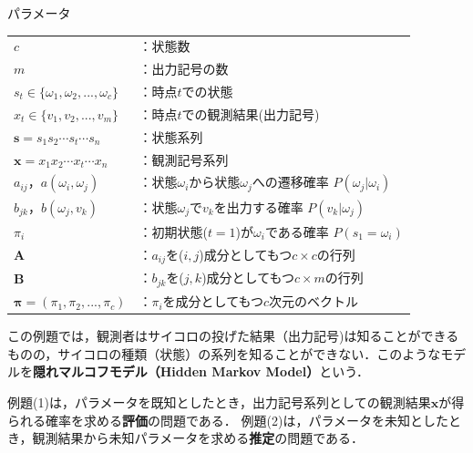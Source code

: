\documentclass[a4j]{jarticle}
\begin{document}
\begin{myframe}{パラメータ}
	\begin{tabular}{ll}
		$c$ & ：状態数 \\
		$m$ & ：出力記号の数 \\
		$s_{t} \in \{\omega_{1}, \omega_{2},..., \omega_{c}\}$ & ：時点$t$での状態 \\
		$x_{t} \in \{v_{1}, v_{2},..., v_{m}\}$ & ：時点$t$での観測結果(出力記号) \\
		$\mathbf{s} = s_{1}s_{2}\cdots s_{t} \cdots s_{n}$ & ：状態系列 \\
		$\mathbf{x} = x_{1}x_{2}\cdots x_{t} \cdots x_{n}$ & ：観測記号系列 \\
		$a_{ij}，a(\omega_{i}, \omega_{j})$ & ：状態$\omega_{i}$から状態$\omega_{j}$への遷移確率 $P(\omega_{j} | \omega_{i})$ \\
		$b_{jk}，b(\omega_{j}, v_{k})$ & ：状態$\omega_{j}$で$v_{k}$を出力する確率 $P(v_{k} | \omega_{j})$\\
		$\pi_{i}$ & ：初期状態($t=1$)が$\omega_{i}$である確率 $P(s_{1} = \omega_{i})$ \\
		$\bm{A}$ & ：$a_{ij}$を($i,j$)成分としてもつ$c \times c$の行列 \\
		$\bm{B}$ & ：$b_{jk}$を($j,k$)成分としてもつ$c \times m$の行列 \\
		$\bm{\pi}=(\pi_{1}, \pi_{2}, ..., \pi_{c})$ & ：$\pi_{i}$を成分としてもつ$c$次元のベクトル
	\end{tabular}
\end{myframe}

この例題では，観測者はサイコロの投げた結果（出力記号)は知ることができるものの，サイコロの種類（状態）の系列を知ることができない．このようなモデルを\textbf{隠れマルコフモデル（Hidden Markov Model）}という．

例題(1)は，パラメータを既知としたとき，出力記号系列としての観測結果$\mathbf{x}$が得られる確率を求める\textbf{評価}の問題である．
例題(2)は，パラメータを未知としたとき，観測結果から未知パラメータを求める\textbf{推定}の問題である．
\end{document}
